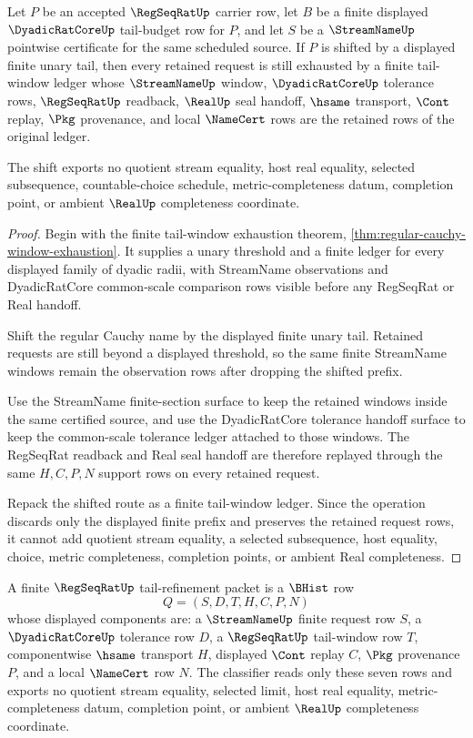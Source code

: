 \begin{theorem}
\label{thm:regseqrat-finite-tail-window-shift-exhaustion}
Let $P$ be an accepted $\RegSeqRatUp$ carrier row, let $B$ be a finite displayed $\DyadicRatCoreUp$ tail-budget row for $P$, and let $S$ be a $\StreamNameUp$ pointwise certificate for the same scheduled source. If $P$ is shifted by a displayed finite unary tail, then every retained request is still exhausted by a finite tail-window ledger whose $\StreamNameUp$ window, $\DyadicRatCoreUp$ tolerance rows, $\RegSeqRatUp$ readback, $\RealUp$ seal handoff, $\hsame$ transport, $\Cont$ replay, $\Pkg$ provenance, and local $\NameCert$ rows are the retained rows of the original ledger.

The shift exports no quotient stream equality, host real equality, selected subsequence, countable-choice schedule, metric-completeness datum, completion point, or ambient $\RealUp$ completeness coordinate.
\end{theorem}
\begin{proof}
Begin with the finite tail-window exhaustion theorem, \autoref{thm:regular-cauchy-window-exhaustion}. It supplies a unary threshold and a finite ledger for every displayed family of dyadic radii, with StreamName observations and DyadicRatCore common-scale comparison rows visible before any RegSeqRat or Real handoff.

Shift the regular Cauchy name by the displayed finite unary tail. Retained requests are still beyond a displayed threshold, so the same finite StreamName windows remain the observation rows after dropping the shifted prefix.

Use the StreamName finite-section surface to keep the retained windows inside the same certified source, and use the DyadicRatCore tolerance handoff surface to keep the common-scale tolerance ledger attached to those windows. The RegSeqRat readback and Real seal handoff are therefore replayed through the same $H,C,P,N$ support rows on every retained request.

Repack the shifted route as a finite tail-window ledger. Since the operation discards only the displayed finite prefix and preserves the retained request rows, it cannot add quotient stream equality, a selected subsequence, host equality, choice, metric completeness, completion points, or ambient Real completeness.
\end{proof}

\begin{definition}
\label{def:regseqrat-tail-refinement-carrier}
A finite $\RegSeqRatUp$ tail-refinement packet is a $\BHist$ row
$$
Q=(S,D,T,H,C,P,N)
$$
whose displayed components are: a $\StreamNameUp$ finite request row $S$, a $\DyadicRatCoreUp$ tolerance row $D$, a $\RegSeqRatUp$ tail-window row $T$, componentwise $\hsame$ transport $H$, displayed $\Cont$ replay $C$, $\Pkg$ provenance $P$, and a local $\NameCert$ row $N$. The classifier reads only these seven rows and exports no quotient stream equality, selected limit, host real equality, metric-completeness datum, completion point, or ambient $\RealUp$ completeness coordinate.
\end{definition}

